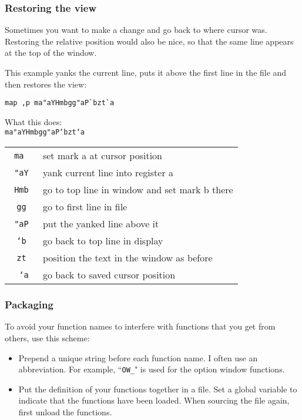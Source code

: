 \subsubsection{Restoring the view}
Sometimes you want to make a change and go back to where cursor was.
Restoring the relative position would also be nice, so that the same line appears at the top of the window.

This example yanks the current line, puts it above the first line in the file and then restores the view:

\begin{Verbatim}[samepage=true]
 map ,p ma"aYHmbgg"aP`bzt`a
\end{Verbatim}

What this does:\\
\texttt{ma"aYHmbgg"aP`bzt`a}
\begin{center} \begin{tabular}{c l} %
\texttt{ma                 } & set mark a at cursor position \\
\texttt{  "aY              } & yank current line into register a \\
\texttt{     Hmb           } & go to top line in window and set mark b there \\
\texttt{        gg         } & go to first line in file \\
\texttt{          "aP      } & put the yanked line above it \\
\texttt{             `b    } & go back to top line in display \\
\texttt{               zt  } & position the text in the window as before \\
\texttt{                 `a} & go back to saved cursor position \\
\end{tabular} \end{center}

\subsubsection{Packaging}
To avoid your function names to interfere with functions that you get from others, use this scheme:
\begin{itemize}
				\item Prepend a unique string before each function name.
								I often use an abbreviation.
								For example, ``\texttt{OW\_}" is used for the option window functions.
				\item Put the definition of your functions together in a file.
								Set a global variable to indicate that the functions have been loaded.
								When sourcing the file again, first unload the functions.
\end{itemize}

